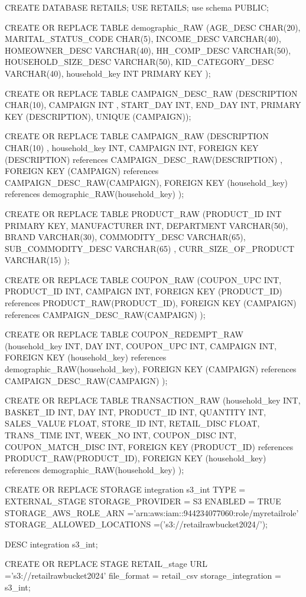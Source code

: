 CREATE DATABASE RETAILS;
USE RETAILS;
use schema PUBLIC;

CREATE OR REPLACE TABLE demographic_RAW
(AGE_DESC	CHAR(20),
MARITAL_STATUS_CODE	CHAR(5),
INCOME_DESC	VARCHAR(40),
HOMEOWNER_DESC	VARCHAR(40),
HH_COMP_DESC	VARCHAR(50),
HOUSEHOLD_SIZE_DESC	VARCHAR(50),
KID_CATEGORY_DESC	VARCHAR(40),
household_key INT PRIMARY KEY
);

CREATE OR REPLACE TABLE CAMPAIGN_DESC_RAW
(DESCRIPTION CHAR(10),	
CAMPAIGN	INT ,
START_DAY	INT,
END_DAY INT,
PRIMARY KEY (DESCRIPTION),
UNIQUE (CAMPAIGN));


CREATE OR REPLACE TABLE CAMPAIGN_RAW
(DESCRIPTION	CHAR(10) ,
household_key	INT,
CAMPAIGN INT,
FOREIGN KEY (DESCRIPTION) references CAMPAIGN_DESC_RAW(DESCRIPTION) ,
FOREIGN KEY (CAMPAIGN) references CAMPAIGN_DESC_RAW(CAMPAIGN),
FOREIGN KEY (household_key) references demographic_RAW(household_key)
);

CREATE OR REPLACE TABLE PRODUCT_RAW
(PRODUCT_ID	INT PRIMARY KEY,
MANUFACTURER 	INT,
DEPARTMENT	VARCHAR(50),
BRAND	VARCHAR(30),
COMMODITY_DESC	VARCHAR(65),
SUB_COMMODITY_DESC VARCHAR(65)	,
CURR_SIZE_OF_PRODUCT VARCHAR(15)
);


CREATE OR REPLACE TABLE COUPON_RAW
(COUPON_UPC	INT,
PRODUCT_ID	INT,
CAMPAIGN INT,
FOREIGN KEY (PRODUCT_ID) references PRODUCT_RAW(PRODUCT_ID),
FOREIGN KEY (CAMPAIGN) references CAMPAIGN_DESC_RAW(CAMPAIGN)
);


CREATE OR REPLACE TABLE COUPON_REDEMPT_RAW
(household_key	INT,
DAY	INT,
COUPON_UPC	INT,
CAMPAIGN INT,
FOREIGN KEY (household_key) references demographic_RAW(household_key),
FOREIGN KEY (CAMPAIGN) references CAMPAIGN_DESC_RAW(CAMPAIGN)
);

CREATE OR REPLACE TABLE TRANSACTION_RAW 
(household_key	INT,
BASKET_ID	INT,
DAY	INT,
PRODUCT_ID	INT,
QUANTITY	INT,
SALES_VALUE	FLOAT,
STORE_ID	INT,
RETAIL_DISC	FLOAT,
TRANS_TIME	INT,
WEEK_NO	INT,
COUPON_DISC	INT,
COUPON_MATCH_DISC INT,
FOREIGN KEY (PRODUCT_ID) references PRODUCT_RAW(PRODUCT_ID),
FOREIGN KEY (household_key) references demographic_RAW(household_key)
);

CREATE OR REPLACE STORAGE integration s3_int
TYPE = EXTERNAL_STAGE
STORAGE_PROVIDER = S3
ENABLED = TRUE
STORAGE_AWS_ROLE_ARN ='arn:aws:iam::944234077060:role/myretailrole' 
STORAGE_ALLOWED_LOCATIONS =('s3://retailrawbucket2024/');

DESC integration s3_int;


CREATE OR REPLACE STAGE RETAIL_stage
URL ='s3://retailrawbucket2024'
file_format = retail_csv
storage_integration = s3_int;

